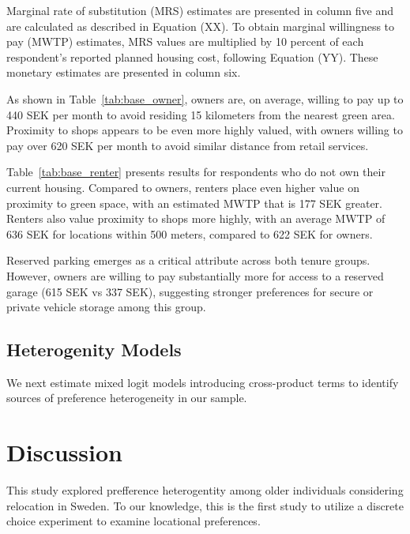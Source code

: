 \documentclass[3p,11pt ]{elsarticle}
\begin{document}
Marginal rate of substitution (MRS) estimates are presented in column five and are calculated as described in Equation (XX). To obtain marginal willingness to pay (MWTP) estimates, MRS values are multiplied by 10 percent of each respondent's reported planned housing cost, following Equation (YY). These monetary estimates are presented in column six.

As shown in Table~\ref{tab:base_owner},
owners are, on average, willing to pay up to 440 SEK per month to avoid residing 15 kilometers from the nearest green area. Proximity to shops appears to be even more highly valued, with owners willing to pay over 620 SEK per month to avoid similar distance from retail services.

Table~\ref{tab:base_renter} presents results for respondents who do not own their current housing. Compared to owners, renters place even higher value on proximity to green space, with an estimated MWTP that is 177 SEK greater. Renters also value proximity to shops more highly, with an average MWTP of 636 SEK for locations within 500 meters, compared to 622 SEK for owners.

Reserved parking emerges as a critical attribute across both tenure groups. However, owners are willing to pay substantially more for access to a reserved garage (615 SEK vs 337 SEK),
suggesting stronger preferences for secure or private vehicle storage among this group.












\clearpage




\subsection{Heterogenity Models}

We next estimate mixed logit models introducing cross-product terms to identify sources of preference heterogeneity in our sample.


\section{Discussion}

This study explored prefference heterogentity among older individuals considering relocation in Sweden.
To our knowledge, 
this is the first study to utilize a discrete choice experiment to examine locational preferences.
\end{document}
